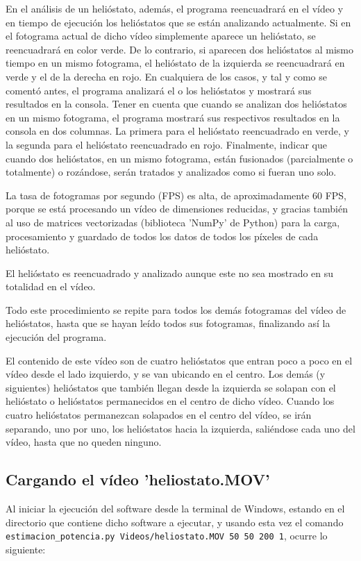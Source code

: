 En el análisis de un helióstato, además, el programa reencuadrará en el vídeo y en tiempo de ejecución los helióstatos que se están analizando actualmente. Si en el fotograma actual de dicho vídeo simplemente aparece un helióstato, se reencuadrará en color verde. De lo contrario, si aparecen dos helióstatos al mismo tiempo en un mismo fotograma, el helióstato de la izquierda se reencuadrará en verde y el de la derecha en rojo. En cualquiera de los casos, y tal y como se comentó antes, el programa analizará el o los helióstatos y mostrará sus resultados en la consola. Tener en cuenta que cuando se analizan dos helióstatos en un mismo fotograma, el programa mostrará sus respectivos resultados en la consola en dos columnas. La primera para el helióstato reencuadrado en verde, y la segunda para el helióstato reencuadrado en rojo. Finalmente, indicar que cuando dos helióstatos, en un mismo fotograma, están fusionados (parcialmente o totalmente) o rozándose, serán tratados y analizados como si fueran uno solo.

La tasa de fotogramas por segundo (FPS) es alta, de aproximadamente 60 FPS, porque se está procesando un vídeo de dimensiones reducidas, y gracias también al uso de matrices vectorizadas (biblioteca 'NumPy' de Python) para la carga, procesamiento y guardado de todos los datos de todos los píxeles de cada helióstato.

El helióstato es reencuadrado y analizado aunque este no sea mostrado en su totalidad en el vídeo.

Todo este procedimiento se repite para todos los demás fotogramas del vídeo de helióstatos, hasta que se hayan leído todos sus fotogramas, finalizando así la ejecución del programa.

El contenido de este vídeo son de cuatro helióstatos que entran poco a poco en el vídeo desde el lado izquierdo, y se van ubicando en el centro. Los demás (y siguientes) helióstatos que también llegan desde la izquierda se solapan con el helióstato o helióstatos permanecidos en el centro de dicho vídeo. Cuando los cuatro helióstatos permanezcan solapados en el centro del vídeo, se irán separando, uno por uno, los helióstatos hacia la izquierda, saliéndose cada uno del vídeo, hasta que no queden ninguno.

\subsection{Cargando el vídeo 'heliostato.MOV'}

Al iniciar la ejecución del software desde la terminal de Windows, estando en el directorio que contiene dicho software a ejecutar, y usando esta vez el comando\\ \verb|estimacion_potencia.py Videos/heliostato.MOV 50 50 200 1|, ocurre lo siguiente:

